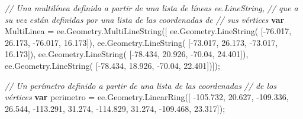 \documentclass[
  12pt,
  letterpaper,
  twoside]{book}
\newenvironment{Shaded}{\begin{snugshade}}{\end{snugshade}}
\newcommand{\AttributeTok}[1]{\textcolor[rgb]{0.48,0.12,0.64}{#1}}
\newcommand{\CommentTok}[1]{\textcolor[rgb]{0.24,0.58,0.00}{\textit{#1}}}
\newcommand{\ControlFlowTok}[1]{\textcolor[rgb]{0.00,0.00,0.00}{\textbf{#1}}}
\newcommand{\FloatTok}[1]{\textcolor[rgb]{0.28,0.53,0.93}{#1}}
\newcommand{\FunctionTok}[1]{\textcolor[rgb]{0.48,0.12,0.64}{#1}}
\newcommand{\KeywordTok}[1]{\textcolor[rgb]{0.48,0.12,0.64}{#1}}
\newcommand{\NormalTok}[1]{#1}
\newcommand{\OperatorTok}[1]{\textcolor[rgb]{0.00,0.00,0.00}{#1}}
\begin{document}
\begin{Shaded}
\begin{Highlighting}[]
\CommentTok{// Una multilínea definida a partir de una lista de líneas ee.LineString, }
\CommentTok{// que a su vez están definidas por una lista de las coordenadas de}
\CommentTok{// sus vértices}
\ControlFlowTok{var}\NormalTok{ MultiLinea }\OperatorTok{=} \KeywordTok{ee}\OperatorTok{.}\AttributeTok{Geometry}\OperatorTok{.}\FunctionTok{MultiLineString}\NormalTok{([ }
   \KeywordTok{ee}\OperatorTok{.}\AttributeTok{Geometry}\OperatorTok{.}\FunctionTok{LineString}\NormalTok{(                     }
\NormalTok{     [}\OperatorTok{{-}}\FloatTok{76.017}\OperatorTok{,} \FloatTok{26.173}\OperatorTok{,} \OperatorTok{{-}}\FloatTok{76.017}\OperatorTok{,} \FloatTok{16.173}\NormalTok{])}\OperatorTok{,}      
   \KeywordTok{ee}\OperatorTok{.}\AttributeTok{Geometry}\OperatorTok{.}\FunctionTok{LineString}\NormalTok{(                      }
\NormalTok{    [}\OperatorTok{{-}}\FloatTok{73.017}\OperatorTok{,} \FloatTok{26.173}\OperatorTok{,} \OperatorTok{{-}}\FloatTok{73.017}\OperatorTok{,} \FloatTok{16.173}\NormalTok{])}\OperatorTok{,}       
   \KeywordTok{ee}\OperatorTok{.}\AttributeTok{Geometry}\OperatorTok{.}\FunctionTok{LineString}\NormalTok{(                      }
\NormalTok{    [}\OperatorTok{{-}}\FloatTok{78.434}\OperatorTok{,} \FloatTok{20.926}\OperatorTok{,} \OperatorTok{{-}}\FloatTok{70.04}\OperatorTok{,} \FloatTok{24.401}\NormalTok{])}\OperatorTok{,}
   \KeywordTok{ee}\OperatorTok{.}\AttributeTok{Geometry}\OperatorTok{.}\FunctionTok{LineString}\NormalTok{(}
\NormalTok{    [}\OperatorTok{{-}}\FloatTok{78.434}\OperatorTok{,} \FloatTok{18.926}\OperatorTok{,} \OperatorTok{{-}}\FloatTok{70.04}\OperatorTok{,} \FloatTok{22.401}\NormalTok{])])}\OperatorTok{;}

\CommentTok{// Un perímetro definido a partir de una lista  de las coordenadas }
\CommentTok{// de los vértices}
\ControlFlowTok{var}\NormalTok{ perimetro }\OperatorTok{=} \KeywordTok{ee}\OperatorTok{.}\AttributeTok{Geometry}\OperatorTok{.}\FunctionTok{LinearRing}\NormalTok{([ }
  \OperatorTok{{-}}\FloatTok{105.732}\OperatorTok{,} \FloatTok{20.627}\OperatorTok{,}                      
  \OperatorTok{{-}}\FloatTok{109.336}\OperatorTok{,} \FloatTok{26.544}\OperatorTok{,}                      
  \OperatorTok{{-}}\FloatTok{113.291}\OperatorTok{,} \FloatTok{31.274}\OperatorTok{,}
  \OperatorTok{{-}}\FloatTok{114.829}\OperatorTok{,} \FloatTok{31.274}\OperatorTok{,}
  \OperatorTok{{-}}\FloatTok{109.468}\OperatorTok{,} \FloatTok{23.317}\NormalTok{])}\OperatorTok{;}
\end{Highlighting}
\end{Shaded}
\end{document}
